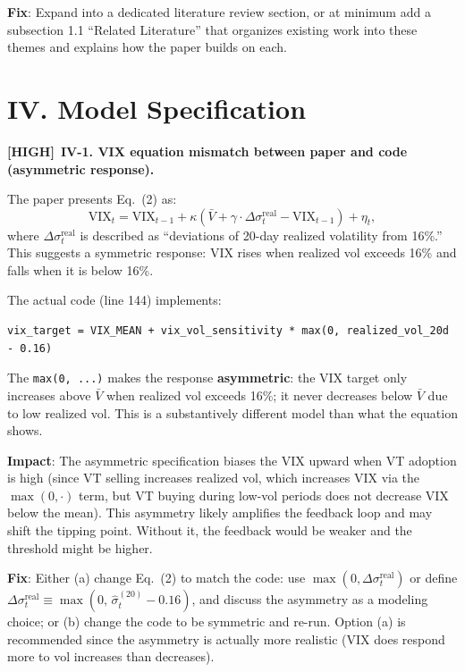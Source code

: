 \documentclass[12pt,a4paper]{article}
\newcommand{\HIGH}{\textbf{\textcolor{errorred}{[HIGH]}}}
\begin{document}
\textbf{Fix}: Expand into a dedicated literature review section, or at minimum add a subsection 1.1 ``Related Literature'' that organizes existing work into these themes and explains how the paper builds on each.


\section*{IV. Model Specification}

\HIGH\ \textbf{IV-1. VIX equation mismatch between paper and code (asymmetric response).}

The paper presents Eq.~(2) as:
\[
\text{VIX}_t = \text{VIX}_{t-1} + \kappa\!\left(\bar{V} + \gamma \cdot \Delta\sigma^{\text{real}}_t - \text{VIX}_{t-1}\right) + \eta_t,
\]
where $\Delta\sigma^{\text{real}}_t$ is described as ``deviations of 20-day realized volatility from 16\%.'' This suggests a symmetric response: VIX rises when realized vol exceeds 16\% and falls when it is below 16\%.

The actual code (line 144) implements:
\begin{verbatim}
vix_target = VIX_MEAN + vix_vol_sensitivity * max(0, realized_vol_20d - 0.16)
\end{verbatim}

The \texttt{max(0, ...)} makes the response \textbf{asymmetric}: the VIX target only increases above $\bar{V}$ when realized vol exceeds 16\%; it never decreases below $\bar{V}$ due to low realized vol. This is a substantively different model than what the equation shows.

\textbf{Impact}: The asymmetric specification biases the VIX upward when VT adoption is high (since VT selling increases realized vol, which increases VIX via the $\max(0,\cdot)$ term, but VT buying during low-vol periods does not decrease VIX below the mean). This asymmetry likely amplifies the feedback loop and may shift the tipping point. Without it, the feedback would be weaker and the threshold might be higher.

\textbf{Fix}: Either (a) change Eq.~(2) to match the code: use $\max(0, \Delta\sigma^{\text{real}}_t)$ or define $\Delta\sigma^{\text{real}}_t \equiv \max(0,\, \hat{\sigma}^{(20)}_t - 0.16)$, and discuss the asymmetry as a modeling choice; or (b) change the code to be symmetric and re-run. Option (a) is recommended since the asymmetry is actually more realistic (VIX does respond more to vol increases than decreases).
\end{document}
